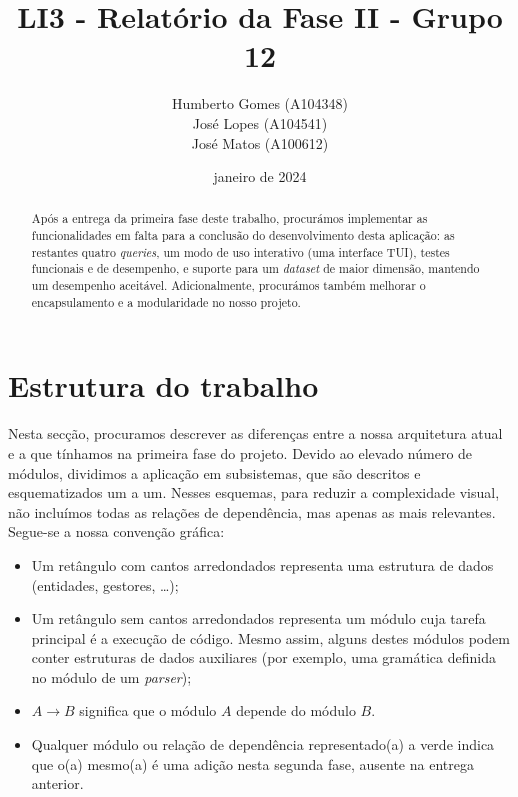 \documentclass[11pt, a4paper]{article}
\title{\textbf{LI3 - Relatório da Fase II - Grupo 12}}
\author{
    Humberto Gomes (A104348) \\
    José Lopes     (A104541) \\
    José Matos     (A100612) \\
}
\date{janeiro de 2024}
\begin{document}
\maketitle
\onehalfspacing
\setlength{\parskip}{\baselineskip}
\setlength{\parindent}{0pt}

\pagebreak
\begin{abstract}
    Após a entrega da primeira fase deste trabalho, procurámos implementar as funcionalidades em
    falta para a conclusão do desenvolvimento desta aplicação: as restantes quatro \emph{queries},
    um modo de uso interativo (uma interface TUI), testes funcionais e de desempenho, e suporte
    para um \emph{dataset} de maior dimensão, mantendo um desempenho aceitável. Adicionalmente,
    procurámos também melhorar o encapsulamento e a modularidade no nosso projeto.
\end{abstract}

\section{Estrutura do trabalho}

Nesta secção, procuramos descrever as diferenças entre a nossa arquitetura atual e a que tínhamos
na primeira fase do projeto. Devido ao elevado número de módulos, dividimos a aplicação em
subsistemas, que são descritos e esquematizados um a um. Nesses esquemas, para reduzir a
complexidade visual, não incluímos todas as relações de dependência, mas apenas as mais relevantes.
Segue-se a nossa convenção gráfica:

\begin{itemize}
    \item Um retângulo com cantos arredondados representa uma estrutura de dados (entidades,
          gestores, \ldots);
    \item Um retângulo sem cantos arredondados representa um módulo cuja tarefa principal é a
          execução de código. Mesmo assim, alguns destes módulos podem conter estruturas de dados
          auxiliares (por exemplo, uma gramática definida no módulo de um \emph{parser});
    \item $A \rightarrow B$ significa que o módulo $A$ depende do módulo $B$.
    \item Qualquer módulo ou relação de dependência representado(a) a {\color{ForestGreen}verde}
          indica que o(a) mesmo(a) é uma adição nesta segunda fase, ausente na entrega anterior.
\end{itemize}
\end{document}
